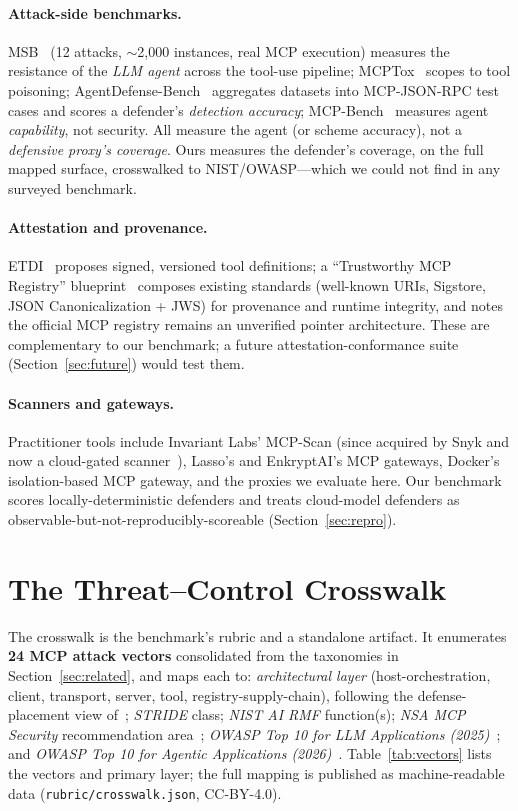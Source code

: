 \documentclass[sigconf,review]{acmart}
\begin{document}
\paragraph{Attack-side benchmarks.} MSB~\cite{msb2510} (12 attacks, $\sim$2{,}000 instances, real MCP execution) measures the resistance of the \emph{LLM agent} across the tool-use pipeline; MCPTox~\cite{mcptox2508} scopes to tool poisoning; AgentDefense-Bench~\cite{agentdefensebench} aggregates datasets into MCP-JSON-RPC test cases and scores a defender's \emph{detection accuracy}; MCP-Bench~\cite{mcpbench2508} measures agent \emph{capability}, not security. All measure the agent (or scheme accuracy), not a \emph{defensive proxy's coverage}. Ours measures the defender's coverage, on the full mapped surface, crosswalked to NIST/OWASP---which we could not find in any surveyed benchmark.

\paragraph{Attestation and provenance.} ETDI~\cite{etdi2506} proposes signed, versioned tool definitions; a ``Trustworthy MCP Registry'' blueprint~\cite{trustreg2026} composes existing standards (well-known URIs, Sigstore, JSON Canonicalization + JWS) for provenance and runtime integrity, and notes the official MCP registry remains an unverified pointer architecture. These are complementary to our benchmark; a future attestation-conformance suite (Section~\ref{sec:future}) would test them.

\paragraph{Scanners and gateways.} Practitioner tools include Invariant Labs' MCP-Scan (since acquired by Snyk and now a cloud-gated scanner~\cite{snykagentscan}), Lasso's and EnkryptAI's MCP gateways, Docker's isolation-based MCP gateway, and the proxies we evaluate here. Our benchmark scores locally-deterministic defenders and treats cloud-model defenders as observable-but-not-reproducibly-scoreable (Section~\ref{sec:repro}).

\section{The Threat--Control Crosswalk}\label{sec:crosswalk}
The crosswalk is the benchmark's rubric and a standalone artifact. It enumerates \textbf{24 MCP attack vectors} consolidated from the taxonomies in Section~\ref{sec:related}, and maps each to: \emph{architectural layer} (host-orchestration, client, transport, server, tool, registry-supply-chain), following the defense-placement view of~\cite{mcpdpt2604}; \emph{STRIDE} class; \emph{NIST AI RMF} function(s); \emph{NSA MCP Security} recommendation area~\cite{nsamcp2026}; \emph{OWASP Top 10 for LLM Applications (2025)}~\cite{owaspllm2025}; and \emph{OWASP Top 10 for Agentic Applications (2026)}~\cite{owaspasi2026}. Table~\ref{tab:vectors} lists the vectors and primary layer; the full mapping is published as machine-readable data (\texttt{rubric/crosswalk.json}, CC-BY-4.0).
\end{document}
